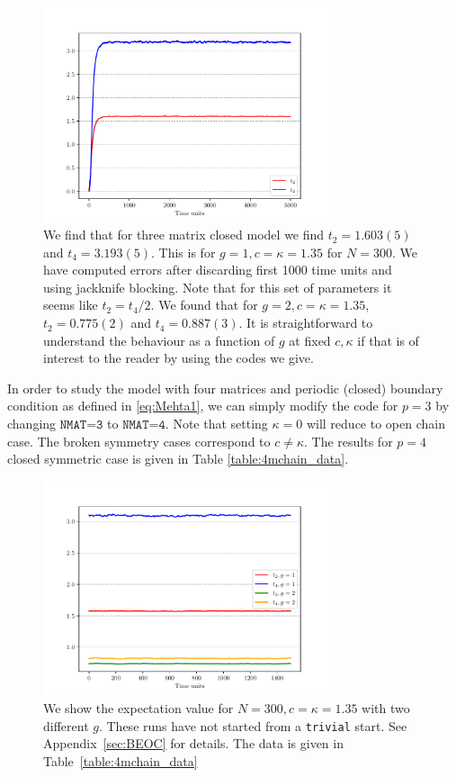 \documentclass[11pt]{article}
\begin{document}
\begin{figure}[htbp] 
	\centering 
	\includegraphics[width=0.75\textwidth]{figs/3MM_closed.pdf}
	\caption{\label{fig:3MM_closed}We find that for three matrix closed model we find $t_{2} = 1.603(5)$ and $t_{4} = 3.193(5)$. 
	This is for $g=1, c=\kappa=1.35$ for $N=300$. We have computed errors after discarding first 1000 time units and 
	using jackknife blocking. Note that for this set of parameters it seems like $t_{2} = t_{4}/2$. We found that 
	for $g=2, c=\kappa=1.35$, $t_{2} = 0.775(2)$ and $t_{4} = 0.887(3)$. It is straightforward to understand the behaviour as a function of $g$ at fixed $c, \kappa$ if that is of interest to the reader by using the codes we give.}
\end{figure}

In order to study the model with four matrices and periodic (closed) boundary condition 
as defined in \ref{eq:Mehta1}, we can simply modify the code for $p=3$ by changing 
$\texttt{NMAT=3}$ to  $\texttt{NMAT=4}$. Note that setting $\kappa=0$ 
will reduce to open chain case. The broken symmetry 
cases correspond to $ c \neq \kappa$. The results for $p=4$ closed symmetric case is 
given in Table \ref{table:4mchain_data}. 
\begin{figure}[htbp] 
	\centering 
	\includegraphics[width=0.75\textwidth]{figs/4MM_g1_g2.pdf}
\caption{\label{fig:4MM_closed1} We show the expectation value for $N=300, c=\kappa=1.35$ with two different $g$. These runs have not started from a \texttt{trivial} start. See Appendix~\ref{sec:BEOC} for details. The data is given in Table~\ref{table:4mchain_data}}
\end{figure}
\end{document}
